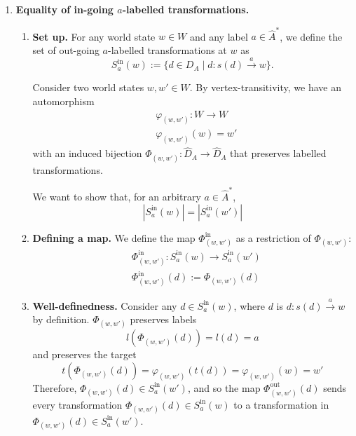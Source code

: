 \begin{proofE}
\begin{enumerate}
    \item \textbf{Equality of in-going $a$-labelled transformations.}
    \begin{enumerate}
        \item \textbf{Set up.}
        For any world state $w \in W$ and any label $a \in \hat{A}^{*}$, we define the set of out-going $a$-labelled transformations at $w$ as
        \begin{equation}
            S_{a}^{\text{in}}(w) := \{ d \in D_{A} \mid d: s(d) \xrightarrow{a} w \}.
        \end{equation}

        Consider two world states $w, w' \in W$.
        By vertex-transitivity, we have an automorphism
        \begin{equation}
        \begin{aligned}
            & \varphi_{(w,w')}: W \to W \\
            & \varphi_{(w,w')}(w) = w'
        \end{aligned}
        \end{equation}
        with an induced bijection $\Phi_{(w, w')}: \hat{D}_{A} \to \hat{D}_{A}$ that preserves labelled transformations.

        We want to show that, for an arbitrary $a \in \hat{A}^{*}$,
        \begin{equation}
            |S_{a}^{\text{in}}(w)| = |S_{a}^{\text{in}}(w')|
        \end{equation}

        \item \textbf{Defining a map.}
        We define the map $\Phi_{(w, w')}^{\text{in}}$ as a restriction of $\Phi_{(w, w')}$:
        \begin{equation}
        \begin{aligned}
            & \Phi_{(w, w')}^{\text{in}}: S_{a}^{\text{in}}(w) \to S_{a}^{\text{in}}(w') \\
            & \Phi_{(w, w')}^{\text{in}}(d) := \Phi_{(w, w')}(d)
        \end{aligned}
        \end{equation}

        \item \textbf{Well-definedness.}
        Consider any $d \in S_{a}^{\text{in}}(w)$, where $d$ is $d: s(d) \xrightarrow{a} w$ by definition.
        $\Phi_{(w, w')}$ preserves labels
        \begin{equation}
            l(\Phi_{(w, w')}(d)) = l(d) = a
        \end{equation}
        and preserves the target
        \begin{equation}
            t(\Phi_{(w, w')}(d)) = \varphi_{(w, w')}(t(d)) = \varphi_{(w, w')}(w) = w'
        \end{equation}
        Therefore, $\Phi_{(w, w')}(d) \in S_{a}^{\text{in}}(w')$, and so the map $\Phi_{(w, w')}^{\text{out}}(d)$ sends every transformation $\Phi_{(w, w')}(d) \in S_{a}^{\text{in}}(w)$ to a transformation in $\Phi_{(w, w')}(d) \in S_{a}^{\text{in}}(w')$.


\end{enumerate}
\end{enumerate}
\end{proofE}

